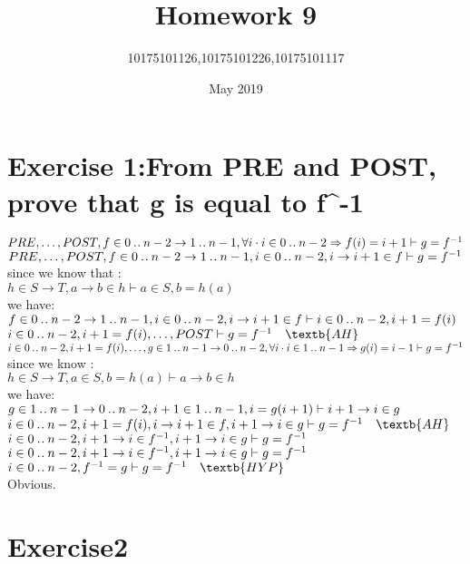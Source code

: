 \documentclass[11pt,a4paper,fleqn]{article}
\title{Homework 9}
\author{10175101126,10175101226,10175101117}
\date{May 2019}
\begin{document}
\maketitle


\section{Exercise 1:From PRE and POST, prove that g is equal to  f^{-1}}
\noindent
$PRE,\ldots,POST ,f \in 0 \mathbin{.\mkern1mu.} n-2 \rightarrow 1 \mathbin{.\mkern1mu.} n-1, \forall i \cdot i\in 0\mathbin{.\mkern1mu.} n-2 \Rightarrow f(i)=i+1 \vdash g = f^{-1}  $\\
$PRE,\ldots,POST ,f \in 0 \mathbin{.\mkern1mu.} n-2 \rightarrow 1 \mathbin{.\mkern1mu.} n-1, i\in 0\mathbin{.\mkern1mu.} n-2 , i \rightarrow i+1 \in f \vdash g = f^{-1}  $\\
since we know that :\\
$h\in S \rightarrow T,a \rightarrow b \in h \vdash a \in S,b=h(a) $\\
we have:\\
$ f \in 0 \mathbin{.\mkern1mu.} n-2 \rightarrow 1 \mathbin{.\mkern1mu.} n-1,i\in 0\mathbin{.\mkern1mu.} n-2 , i \rightarrow i+1 \in f \vdash i \in 0\mathbin{.\mkern1mu.} n-2,i+1 = f(i) $\\
$ i\in 0\upto n-2 ,i+1 = f(i) ,\ldots,POST  \vdash g = f^{-1} \quad \textb{AH} $\\
$ i\in 0\mathbin{.\mkern1mu.} n-2 ,i+1 = f(i) ,\ldots, g \in 1 \mathbin{.\mkern1mu.} n-1 \rightarrow 0 \mathbin{.\mkern1mu.} n-2, \forall i \cdot i \in 1 \mathbin{.\mkern1mu.} n-1 \Rightarrow g(i) = i-1  \vdash g = f^{-1}  $\\
since we know :\\
$ h \in S \rightarrow T, a \in S,b = h(a) \vdash a \rightarrow b \in h $\\
we have:\\
$ g \in 1 \mathbin{.\mkern1mu.} n-1 \rightarrow 0\mathbin{.\mkern1mu.} n-2, i+1 \in 1 \mathbin{.\mkern1mu.} n-1, i = g(i+1) \vdash i+1 \rightarrow i \in g $\\
$ i\in 0\upto n-2 ,i+1 = f(i) ,i \rightarrow i+1 \in f,i+1 \rightarrow i \in g  \vdash g = f^{-1}  \quad \textb{AH}$\\
$ i\in 0\mathbin{.\mkern1mu.} n-2 ,i+1 \rightarrow i \in f^{-1},i+1 \rightarrow i \in g  \vdash g = f^{-1} $\\
$ i\in 0\mathbin{.\mkern1mu.} n-2 ,i+1 \rightarrow i \in f^{-1},i+1 \rightarrow i \in g  \vdash g = f^{-1} $\\
$ i\in 0\upto n-2 , f^{-1} = g  \vdash g = f^{-1} \quad \textb{HYP}$\\
Obvious.



\section{Exercise2 }
\end{document}
